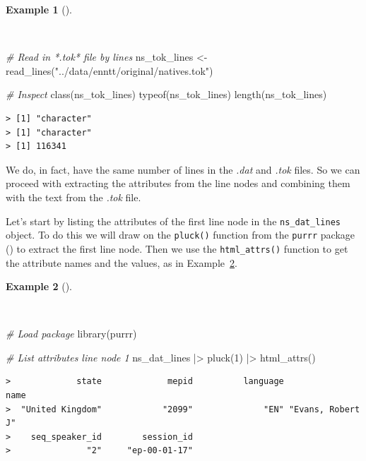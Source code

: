 \documentclass[
  letterpaper,
]{latex/krantz}
\newenvironment{Shaded}{\begin{snugshade}}{\end{snugshade}}
\newcommand{\CommentTok}[1]{\textcolor[rgb]{0.00,0.00,0.00}{\textit{#1}}}
\newcommand{\DecValTok}[1]{\textcolor[rgb]{0.00,0.00,0.00}{#1}}
\newcommand{\FunctionTok}[1]{\textcolor[rgb]{0.00,0.00,0.00}{#1}}
\newcommand{\NormalTok}[1]{\textcolor[rgb]{0.00,0.00,0.00}{#1}}
\newcommand{\OtherTok}[1]{\textcolor[rgb]{0.00,0.00,0.00}{#1}}
\newcommand{\SpecialCharTok}[1]{\textcolor[rgb]{0.00,0.00,0.00}{#1}}
\newcommand{\StringTok}[1]{\textcolor[rgb]{0.00,0.00,0.00}{#1}}
\theoremstyle{definition}
\newtheorem{example}{Example}[chapter]
\theoremstyle{remark}
\begin{document}
\begin{example}[]\protect\hypertarget{exm-cd-enntt-read-lines}{}\label{exm-cd-enntt-read-lines}

~

\begin{Shaded}
\begin{Highlighting}[]
\CommentTok{\# Read in *.tok* file by lines}
\NormalTok{ns\_tok\_lines }\OtherTok{\textless{}{-}}
  \FunctionTok{read\_lines}\NormalTok{(}\StringTok{"../data/enntt/original/natives.tok"}\NormalTok{)}

\CommentTok{\# Inspect}
\FunctionTok{class}\NormalTok{(ns\_tok\_lines)}
\FunctionTok{typeof}\NormalTok{(ns\_tok\_lines)}
\FunctionTok{length}\NormalTok{(ns\_tok\_lines)}
\end{Highlighting}
\end{Shaded}

\begin{verbatim}
> [1] "character"
> [1] "character"
> [1] 116341
\end{verbatim}

\end{example}

We do, in fact, have the same number of lines in the \emph{.dat} and
\emph{.tok} files. So we can proceed with extracting the attributes from
the line nodes and combining them with the text from the \emph{.tok}
file.

Let's start by listing the attributes of the first line node in the
\texttt{ns\_dat\_lines} object. To do this we will draw on the
\texttt{pluck()} function from the \texttt{purrr} package
() to extract the first
line node. Then we use the \texttt{html\_attrs()} function to get the
attribute names and the values, as in
Example~\ref{exm-cd-enntt-list-attributes}.

\begin{example}[]\protect\hypertarget{exm-cd-enntt-list-attributes}{}\label{exm-cd-enntt-list-attributes}

~

\begin{Shaded}
\begin{Highlighting}[]
\CommentTok{\# Load package}
\FunctionTok{library}\NormalTok{(purrr)}

\CommentTok{\# List attributes line node 1}
\NormalTok{ns\_dat\_lines }\SpecialCharTok{|\textgreater{}}
  \FunctionTok{pluck}\NormalTok{(}\DecValTok{1}\NormalTok{) }\SpecialCharTok{|\textgreater{}}
  \FunctionTok{html\_attrs}\NormalTok{()}
\end{Highlighting}
\end{Shaded}

\begin{verbatim}
>             state             mepid          language              name 
>  "United Kingdom"            "2099"              "EN" "Evans, Robert J" 
>    seq_speaker_id        session_id 
>               "2"     "ep-00-01-17"
\end{verbatim}

\end{example}
\end{document}
